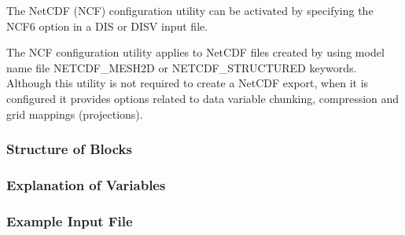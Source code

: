 The NetCDF (NCF) configuration utility can be activated by specifying the NCF6 option in a DIS or DISV input file.

The NCF configuration utility applies to NetCDF files created by \mf using model name file NETCDF\_MESH2D or NETCDF\_STRUCTURED keywords. Although this utility is not required to create a NetCDF export, when it is configured it provides options related to data variable chunking, compression and grid mappings (projections).

\subsubsection{Structure of Blocks}



\vspace{5mm}

\subsubsection{Explanation of Variables}
\begin{description}

\end{description}
\vspace{5mm}

\subsubsection{Example Input File}

